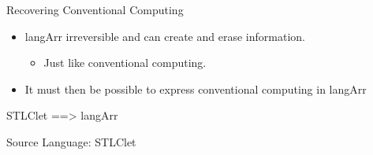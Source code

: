 \documentclass[svgnames,11pt]{beamer}
\begin{document}
\begin{frame}{Recovering Conventional Computing}

  \begin{itemize}
    \vfill
  \item {{langArr}}  irreversible and can create and erase information.
    \begin{itemize}
    \item Just like conventional computing.
    \end{itemize}

    \vfill
  \item It must then be possible to express conventional computing in {{langArr}}

  \end{itemize}

    \vfill
    \begin{center}
      {{STLClet ==> langArr}}
    \end{center}

\end{frame}


\begin{frame}{Source Language: {{STLClet}} }
  
%
%

%
%


\end{frame}
\end{document}
